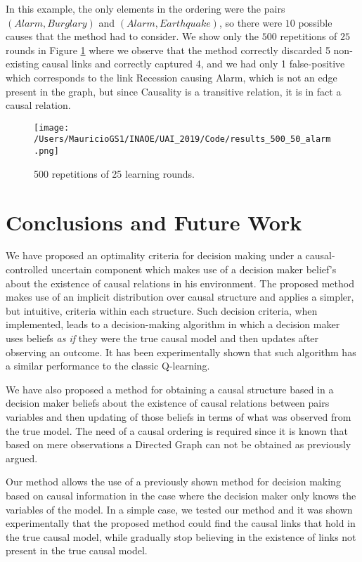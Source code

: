 \documentclass[letterpaper]{article}
\begin{document}
In this example, the only elements in the ordering were the pairs $(Alarm, Burglary)$ and $(Alarm,Earthquake)$, so there were $10$ possible causes that the method had to consider. We show only the $500$ repetitions of $25$ rounds in Figure \ref{500_25_alarm_problem} where we observe that the method correctly discarded 5 non-existing causal links and correctly captured 4, and we had only 1 false-positive which corresponds to the link Recession causing Alarm, which is not an edge present in the graph, but since Causality is a transitive relation, it is in fact a causal relation.

\begin{figure}[ht]
\vskip 0.2in
\begin{center}
\centerline{\texttt{[image: /Users/MauricioGS1/INAOE/UAI\_2019/Code/results\_500\_50\_alarm.png]}}
\caption{500 repetitions of 25 learning rounds.}
\label{500_25_alarm_problem}
\end{center}
\vskip -0.2in
\end{figure}


\section{Conclusions and Future Work}
We have proposed an optimality criteria for decision making under a causal-controlled uncertain component which makes use of a decision maker belief's about the existence of causal relations in his environment. The proposed method makes use of an implicit distribution over causal structure and applies a simpler, but intuitive, criteria within each structure. Such decision criteria, when implemented, leads to a decision-making algorithm in which a decision maker uses beliefs \textit{as if} they were the true causal model and then updates after observing an outcome. It has been experimentally shown that such algorithm has a similar performance to the classic Q-learning. 

We have also proposed a method for obtaining a causal structure based in a decision maker beliefs about the existence of causal relations between pairs variables and then updating of those beliefs in terms of what was observed from the true model. The need of a causal ordering is required since it is known that based on mere observations a Directed Graph can not be obtained as previously argued.

Our method allows the use of a previously shown method for decision making based on causal information in the case where the decision maker only knows the variables of the model. In a simple case, we tested our method and it was shown experimentally that the proposed method could find the causal links that hold in the true causal model, while gradually stop believing in the existence of links not present in the true causal model.
\end{document}
